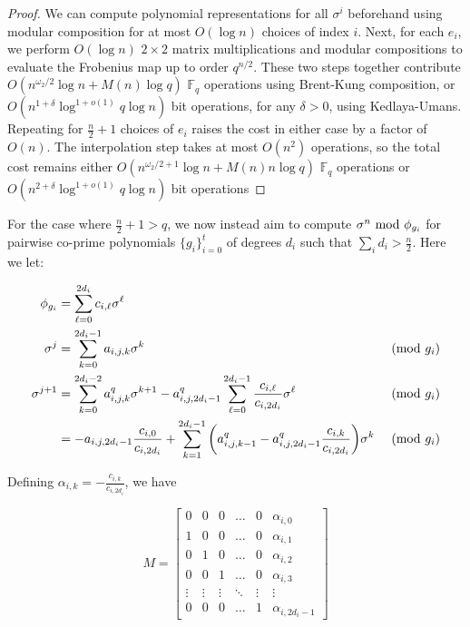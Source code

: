 \documentclass{acmart}
\theoremstyle{remark}
\numberwithin{equation}{section}
\begin{document}
\begin{proof}
We can compute polynomial representations for all $\sigma^i$ beforehand using modular composition for at most $O(\log n)$ choices of index $i$. Next, for each $e_i$, we perform $O(\log n)$ $2\times 2$ matrix multiplications and modular compositions to evaluate the Frobenius map up to order $q^{n/2}$. These two steps together contribute $O(n^{\omega_2/2} \log n + M(n) \log q )$ $\mathbb{F}_q$ operations using Brent-Kung composition, or $O(n^{1+\delta} \log^{1 + o(1)} q \log n)$ bit operations, for any $\delta > 0$, using Kedlaya-Umans. Repeating for $\frac{n}{2} + 1$ choices of $e_i$ raises the cost in either case by a factor of $O(n)$. The interpolation step takes at most $O(n^2)$ operations, so the total cost remains either $O(n^{\omega_2/2 + 1} \log n + M(n) n \log q)$ $\mathbb{F}_q$ operations  or $O(n^{2+\delta} \log^{1 + o(1)} q \log n)$ bit operations

\end{proof}




For the case where $\frac{n}{2} + 1 > q$, we now instead aim to compute $\sigma^n \textnormal{ mod } \phi_{g_i}$ for pairwise co-prime polynomials $\{g_i\}_{i=0}^{t}$ of degrees $d_i$ such that $\sum_{i} d_i > \frac{n}{2}$. Here we let:

\begin{align*}
\phi_{g_i} & = \sum_{\ell = 0}^{2d_i} c_{i,\ell} \sigma^{\ell} & \\
\sigma^{j} & = \sum_{k=0}^{2d_i-1}a_{i,j,k}\sigma^k & \textnormal{ (mod } g_i \textnormal{)} \\
\sigma^{j+1} & =  \sum_{k=0}^{2d_i-2}a_{i,j,k}^q\sigma^{k+1} - a_{i,j,2d_i-1}^q\sum_{\ell = 0}^{2d_i - 1} \frac{c_{i,\ell}}{c_{i,2d_i}} \sigma^{\ell}  & \textnormal{ (mod } g_i \textnormal{)}\\
 & = -a_{i,j,2d_i -1}\frac{c_{i,0}}{c_{i,2d_i}} + \sum_{k=1}^{2d_{i}-1} \bigg( a_{i,j,k -1}^q - a_{i,j,2d_i-1}^q\frac{c_{i,k}}{c_{i,2d_i}}\bigg)\sigma^k & \textnormal{ (mod } g_i \textnormal{)}
\end{align*}

Defining $\alpha_{i,k} = -\frac{c_{i,k}}{c_{i,2d_i}}$, we have

\[M = \begin{bmatrix} 0 & 0 & 0 & \ldots & 0 & \alpha_{i,0} \\
                      1 & 0 & 0 & \ldots & 0 & \alpha_{i,1} \\
                      0 & 1 & 0 & \ldots & 0 & \alpha_{i,2} \\
                      0 & 0 & 1 & \ldots & 0 & \alpha_{i,3} \\
                      \vdots & \vdots & \vdots & \ddots & \vdots & \vdots \\
                      0 & 0 & 0 & \ldots & 1 & \alpha_{i,2d_i - 1}
\end{bmatrix}\]
\end{document}
